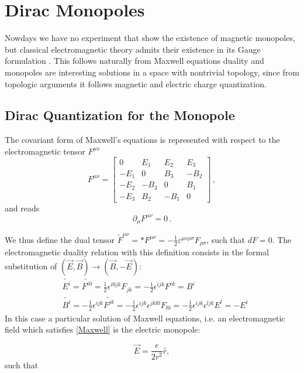 \documentclass[main.tex]{subfiles}
\begin{document}
\section{Dirac Monopoles}

 Nowdays we have no experiment that show the existence of magnetic monopoles, but classical electromagnetic theory admits their existence in its Gauge formulation \cite{Dirac}. This follows naturally from Maxwell equations duality and monopoles are interesting solutions in a space with nontrivial topology, since from topologic arguments it follows magnetic and electric charge quantization.

\subsection{Dirac Quantization for the Monopole}


The covariant form of Maxwell's equations is represented with respect to  the electromagnetic tensor $F^{\mu \nu}$
%
\begin{equation}
  F^{\mu\nu} = \begin{bmatrix}
  0   & E_1  & E_2  & E_3 \\
  -E_1   & 0  & B_3  & -B_2 \\
  -E_2   & -B_3  & 0  & B_1 \\
  -E_3   & B_2  & -B_1  & 0
  \end{bmatrix}\,,
\end{equation}
%
and reads
\begin{equation}\label{Maxwell}
\partial_{\mu}F^{\mu \nu}=0\,.
\end{equation}

We thus define the dual tensor
$\tilde{F}^{\mu\nu}=*F^{\mu\nu}=-\frac{1}{2}\varepsilon^{\mu \nu \rho \sigma}F_{\rho \sigma}$,
such that $dF=0$. The electromagnetic duality relation with this definition consists in the formal substitution of $(\vec E,\vec B)\to(\vec B,-\vec E)$:
\begin{align}
&\tilde{E^i}=\tilde{F^{i0}}=\frac{1}{2}\epsilon^{i0jk}F_{jk}=-\frac{1}{2}\epsilon^{ijk}F^{ik}=B^i\\
&\tilde{B^i}=-\frac{1}{2}\epsilon^{ijk}\tilde{F^{jk}}=-\frac{1}{2}\epsilon^{ijk}\epsilon^{jkl0}F_{l0}=-\frac{1}{2}\epsilon^{ijk}\epsilon^{ljk}E^l=-E^i
\end{align}
In this case a particular solution of Maxwell equations, i.e. an electromagnetic field which satisfies \eqref{Maxwell} is the electric monopole:

\begin{equation}\label{ElectricMonopole}
\vec E=\frac{e}{2r^2}\hat{r},
\end{equation}
such that
\end{document}
